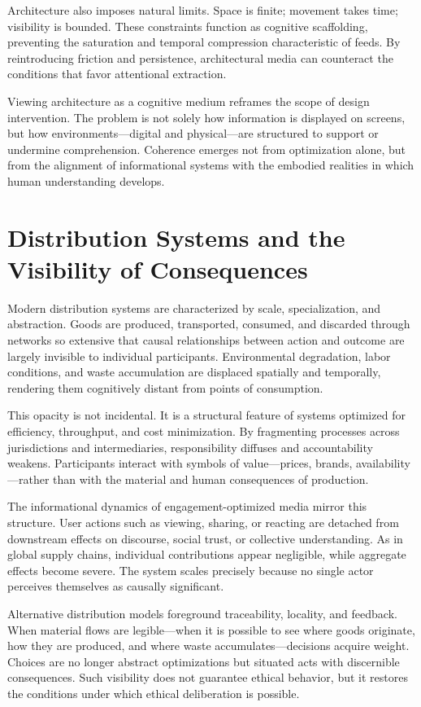 \documentclass[12pt]{article}
\begin{document}
Architecture also imposes natural limits. Space is finite; movement takes time; visibility is bounded. These constraints function as cognitive scaffolding, preventing the saturation and temporal compression characteristic of feeds. By reintroducing friction and persistence, architectural media can counteract the conditions that favor attentional extraction.

Viewing architecture as a cognitive medium reframes the scope of design intervention. The problem is not solely how information is displayed on screens, but how environments—digital and physical—are structured to support or undermine comprehension. Coherence emerges not from optimization alone, but from the alignment of informational systems with the embodied realities in which human understanding develops.

\section{Distribution Systems and the Visibility of Consequences}

Modern distribution systems are characterized by scale, specialization, and abstraction. Goods are produced, transported, consumed, and discarded through networks so extensive that causal relationships between action and outcome are largely invisible to individual participants. Environmental degradation, labor conditions, and waste accumulation are displaced spatially and temporally, rendering them cognitively distant from points of consumption.

This opacity is not incidental. It is a structural feature of systems optimized for efficiency, throughput, and cost minimization. By fragmenting processes across jurisdictions and intermediaries, responsibility diffuses and accountability weakens. Participants interact with symbols of value—prices, brands, availability—rather than with the material and human consequences of production.

The informational dynamics of engagement-optimized media mirror this structure. User actions such as viewing, sharing, or reacting are detached from downstream effects on discourse, social trust, or collective understanding. As in global supply chains, individual contributions appear negligible, while aggregate effects become severe. The system scales precisely because no single actor perceives themselves as causally significant.

Alternative distribution models foreground traceability, locality, and feedback. When material flows are legible—when it is possible to see where goods originate, how they are produced, and where waste accumulates—decisions acquire weight. Choices are no longer abstract optimizations but situated acts with discernible consequences. Such visibility does not guarantee ethical behavior, but it restores the conditions under which ethical deliberation is possible.
\end{document}
